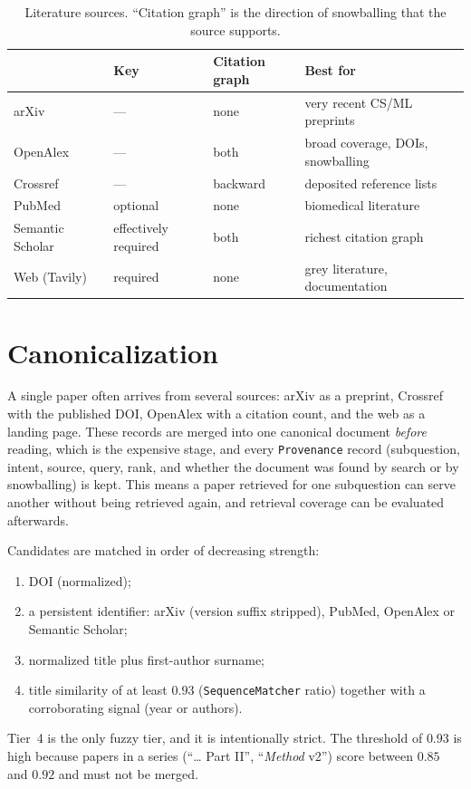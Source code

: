 \documentclass[10pt,a4paper]{article}
\newcommand{\hfont}{\sffamily}
\renewcommand{\paragraph}[1]{%
  \par\vspace{0.35em}{\hfont\bfseries\color{accent}#1}\hspace{0.6em}\ignorespaces}
\newcommand{\code}[1]{\texttt{#1}}
\newcommand{\headrow}{\rowcolor{tablehead}}
\newcommand{\tcol}[1]{{\hfont\bfseries\footnotesize\color{accent}#1}}
\begin{document}
\begin{table}[t]
\centering
\small
\caption{Literature sources. ``Citation graph'' is the direction of
snowballing that the source supports.}
\label{tab:sources}
\begin{tabular}{@{}llll@{}}
\toprule
\headrow \tcol{Source} & \tcol{Key} & \tcol{Citation graph} & \tcol{Best for} \\
\midrule
arXiv            & ---           & none        & very recent CS/ML preprints \\
OpenAlex~\citep{priem2022openalex} & --- & both & broad coverage, DOIs, snowballing \\
Crossref         & ---           & backward    & deposited reference lists \\
PubMed           & optional      & none        & biomedical literature \\
Semantic Scholar~\citep{kinney2025semanticscholaropendata} & effectively required & both & richest citation graph \\
Web (Tavily)     & required      & none        & grey literature, documentation \\
\bottomrule
\end{tabular}
\end{table}

\section{Canonicalization}
\label{sec:canon}

A single paper often arrives from several sources: arXiv as a preprint,
Crossref with the published DOI, OpenAlex with a citation count, and the
web as a landing page. These records are merged into one canonical document
\emph{before} reading, which is the expensive stage, and every
\code{Provenance} record (subquestion, intent, source, query, rank, and
whether the document was found by search or by snowballing) is kept. This
means a paper retrieved for one subquestion can serve another without being
retrieved again, and retrieval coverage can be evaluated afterwards.

\paragraph{Matching hierarchy.} Candidates are matched in order of
decreasing strength:
\begin{enumerate}[leftmargin=*]
  \item DOI (normalized);
  \item a persistent identifier: arXiv (version suffix stripped), PubMed,
    OpenAlex or Semantic Scholar;
  \item normalized title plus first-author surname;
  \item title similarity of at least $0.93$ (\code{SequenceMatcher}
    ratio) together with a corroborating signal (year or authors).
\end{enumerate}
Tier~4 is the only fuzzy tier, and it is intentionally strict. The
threshold of $0.93$ is high because papers in a series (``\ldots{} Part
II'', ``\emph{Method} v2'') score between $0.85$ and $0.92$ and must not be
merged.
\end{document}
